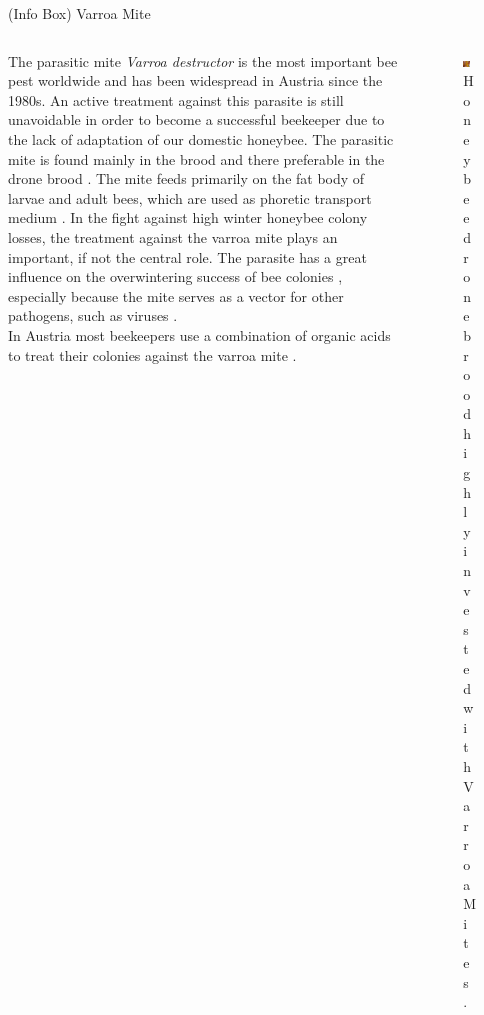 \documentclass{beamer}
\begin{document}
\begin{frame}{}
\begin{columns}[t]
\begin{column}{0.49\textwidth}
    {
      \begin{block}{(Info Box) Varroa Mite}
      \begin{columns}[t,onlytextwidth]
        \begin{column}[t]{.5\linewidth}
        \begin{minipage}[t][17.5cm][c]{0.97\textwidth} 
        The parasitic mite \textit{Varroa destructor} is the most important bee pest worldwide and has been widespread in Austria since the 1980s. An active treatment against this parasite is still unavoidable in order to become a successful beekeeper due to the lack of adaptation of our domestic honeybee. The parasitic mite is found mainly in the brood and there preferable in the drone brood \citep{rosenkranz2010}. The mite feeds primarily on the fat body of larvae and adult bees, which are used as phoretic transport medium \citep{ramsey2019}. In the fight against high winter honeybee colony losses, the treatment against the varroa mite plays an important, if not the central role. The parasite has a great influence on the overwintering success of bee colonies \citep{dahle2010}, especially because the mite serves as a vector for other pathogens, such as viruses \citep{rosenkranz2010, noel2020}. \\
        In Austria most beekeepers use a combination of organic acids to treat their colonies against the varroa mite \citep{moosbeckhofer2015, oberreiter2020}. 
        \end{minipage}
        \end{column}
        \begin{column}[t]{.5\linewidth}
        \begin{figure}
        \centering
        \includegraphics[width=0.8\textwidth]{img/varroa.jpg}
        \caption{Honeybee dronebrood highly invested with Varroa Mites.}
        \end{figure}
        \end{column}
      \end{columns}
      \end{block}
    }


\end{column}
\end{columns}
\end{frame}
\end{document}
